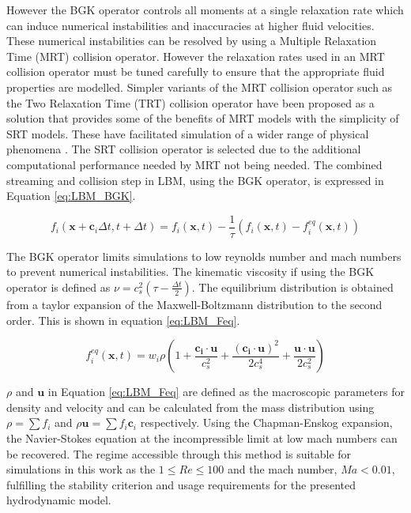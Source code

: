 However the BGK operator controls all moments at a single relaxation rate which can induce numerical instabilities and inaccuracies
at higher fluid velocities. \cite{liu_simulation_2023, adhikari_fluctuating_2005} These numerical instabilities can be resolved by using
a Multiple Relaxation Time (MRT) collision operator. However the relaxation rates used in an MRT collision operator must be tuned carefully
to ensure that the appropriate fluid properties are modelled. Simpler variants of the MRT collision operator such as the Two Relaxation Time (TRT)
collision operator have been proposed as a solution that provides some of the benefits of MRT models with the simplicity of SRT models. These 
have facilitated simulation of a wider range of physical phenomena \cite{adhikari_fluctuating_2005, liu_simulation_2023}. The SRT collision 
operator is selected due to the additional computational performance needed by MRT not being needed. The combined streaming and 
collision step in LBM, using the BGK operator, is expressed in Equation \ref{eq:LBM_BGK}.

\begin{equation}
    f_{i}(\mathbf{x} + \mathbf{c}_{i}\Delta t, t + \Delta t) = f_{i}(\mathbf{x}, t) - \frac{1}{\tau}(f_{i}(\mathbf{x}, t) 
    - f_{i}^{eq}(\mathbf{x}, t))
    \label{eq:LBM_BGK}
\end{equation}

The BGK operator limits simulations to low reynolds number and mach numbers to prevent numerical instabilities. 
\cite{qian_lattice_1992} The kinematic viscosity if using the BGK operator is defined as 
$\nu = c_s^2(\tau - \frac{\Delta t}{2})$. The equilibrium distribution is obtained from a taylor expansion of the 
Maxwell-Boltzmann distribution to the second order. \cite{he_theory_1997, succi_lattice_2018} This is shown in equation 
\ref{eq:LBM_Feq}.

\begin{equation}
    f_{i}^{eq}(\mathbf{x}, t) = w_i\rho(1 + \frac{\mathbf{c_i} \cdot \mathbf{u}}{c_s^2} + \frac{(\mathbf{c_i} \cdot 
    \mathbf{u})^2}{2c_s^4} + \frac{\mathbf{u} \cdot \mathbf{u}}{2c_s^2})
    \label{eq:LBM_Feq}
\end{equation}

$\rho$ and $\textbf{u}$ in Equation \ref{eq:LBM_Feq} are defined as the macroscopic parameters for density and velocity 
and can be calculated from the mass distribution using $\rho = \sum f_i$ and $\rho \mathbf{u} = \sum f_i \mathbf{c}_i$ 
respectively. Using the Chapman-Enskog expansion, the Navier-Stokes equation at the incompressible limit at low mach
numbers can be recovered. \cite{qian_lattice_1992, he_lattice_1997} The regime accessible through this method is suitable 
for simulations in this work as the $ 1 \leq Re \leq 100 $ and the mach number, $Ma < 0.01$, fulfilling the stability 
criterion and usage requirements for the presented hydrodynamic model.

